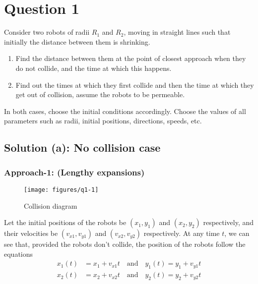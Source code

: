 \section*{Question 1}

Consider two robots of radii \( R_1 \) and \( R_2 \), moving in straight lines such that initially the distance between them is shrinking.
\begin{enumerate}[label= (\alph*), noitemsep, topsep=0pt]
    \item Find the distance between them at the point of closest approach when they do not collide, and the time at which this happens.
    \item Find out the times at which they first collide and then the time at which they get out of collision, assume the robots to be permeable.
\end{enumerate}
In both cases, choose the initial conditions accordingly. Choose the values of all parameters such as radii, initial positions, directions, speeds, etc.

\vspace*{-1em}
\subsection*{Solution (a): No collision case}

\vspace*{-1em}
\subsubsection*{Approach-1: (Lengthy expansions)}

\vspace*{-3em}
\begin{figure}[htbp]
    \centering
    \texttt{[image: figures/q1-1]}
    \vspace*{-2em}
    \caption{
        Collision diagram
    }\label{fig:q1-1}
\end{figure}

Let the initial positions of the robots be \( (x_1, y_1) \) and \( (x_2, y_2) \) respectively, and their velocities be \( (v_{x1}, v_{y1}) \) and \( (v_{x2}, v_{y2}) \) respectively.
At any time \( t \), we can see that, provided the robots don't collide, the position of the robots follow the equations
\begin{align*}
    x_1(t) & = x_1 + v_{x1}t \quad \text{and} \quad y_1(t) = y_1 + v_{y1}t \\
    x_2(t) & = x_2 + v_{x2}t \quad \text{and} \quad y_2(t) = y_2 + v_{y2}t
\end{align*}

